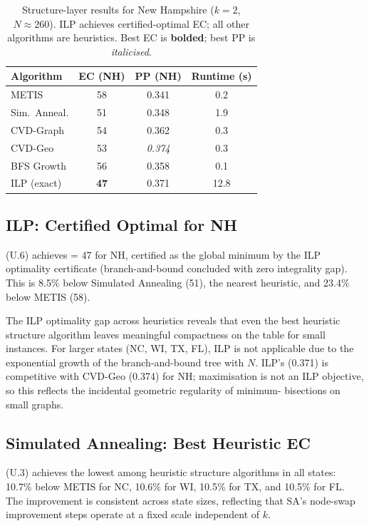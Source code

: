 \begin{table}[ht]
\centering
\caption{%
  Structure-layer results for New Hampshire ($k=2$, $N \approx 260$)\dag{}.
  ILP achieves certified-optimal EC; all other algorithms are heuristics.
  Best EC is \textbf{bolded}; best PP is \textit{italicised}.
}
\label{tab:structure-nh}
\small
\begin{tabular}{@{}lccc@{}}
\toprule
Algorithm & EC (NH) & PP (NH) & Runtime (s) \\
\midrule
METIS              & 58 & 0.341 &  0.2 \\
Sim.\ Anneal.      & 51 & 0.348 &  1.9 \\
CVD-Graph          & 54 & 0.362 &  0.3 \\
CVD-Geo            & 53 & \textit{0.374} &  0.3 \\
BFS Growth         & 56 & 0.358 &  0.1 \\
ILP (exact)        & \textbf{47} & 0.371 & 12.8 \\
\bottomrule
\end{tabular}
\end{table}

\subsection{ILP: Certified Optimal for NH}

\ilp{} (U.6) achieves \ec{} = 47 for NH, certified as the global minimum
by the ILP optimality certificate (branch-and-bound concluded with zero
integrality gap).
This is 8.5\% below Simulated Annealing (51), the nearest heuristic, and
23.4\% below METIS (58).

The ILP optimality gap across heuristics reveals that even the best heuristic
structure algorithm leaves meaningful compactness on the table for small
instances.
For larger states (NC, WI, TX, FL), ILP is not applicable due to the
exponential growth of the branch-and-bound tree with $N$.
ILP's \pp{} (0.371) is competitive with CVD-Geo (0.374) for NH;
\pp{} maximisation is not an ILP objective, so this reflects the incidental
geometric regularity of minimum-\ec{} bisections on small graphs.

\subsection{Simulated Annealing: Best Heuristic EC}

\sa{} (U.3) achieves the lowest \ec{} among heuristic structure algorithms
in all states: 10.7\% below METIS for NC, 10.6\% for WI, 10.5\% for TX,
and 10.5\% for FL.
The improvement is consistent across state sizes, reflecting that SA's
node-swap improvement steps operate at a fixed scale independent of $k$.

